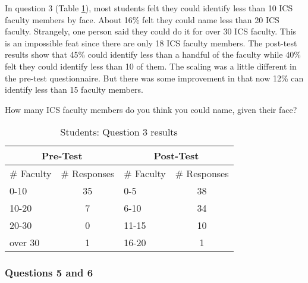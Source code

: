 In question 3 (Table \ref{tab:question3s}), most students felt they could
identify less than 10 ICS faculty members by face.  About 16\% felt they could
name less than 20 ICS faculty.  Strangely, one person said they could do it for
over 30 ICS faculty.  This is an impossible feat since there are only 18 ICS
faculty members.  The post-test results show that 45\% could identify less than
a handful of the faculty while 40\% felt they could identify less than 10 of
them.  The scaling was a little different in the pre-test questionnaire.  But
there was some improvement in that now 12\% can identify less than 15 faculty
members.

\begin{table}[htb]
\caption{Students: Question 3 results}
{How many ICS faculty members do you think you could name,
  given their face?}
\begin{center}
\begin{tabular}{|l|l|l|l|} \hline
 \multicolumn{2}{|c|}{\rule[-2mm]{0mm}{6mm}\bf Pre-Test} &
 \multicolumn{2}{|c|}{\rule[-2mm]{0mm}{6mm}\bf Post-Test} \\ \hline
 \# Faculty & \# Responses & \# Faculty & \# Responses \\ \hline
 0-10    & \multicolumn{1}{|c|}{35} & 0-5 &\multicolumn{1}{|c|}{38} \\ \hline 
 10-20   & \multicolumn{1}{|c|}{7} & 6-10 & \multicolumn{1}{|c|}{34} \\ \hline 
 20-30   & \multicolumn{1}{|c|}{0} & 11-15 & \multicolumn{1}{|c|}{10} \\ \hline 
 over 30 & \multicolumn{1}{|c|}{1} & 16-20 & \multicolumn{1}{|c|}{1} \\ \hline
\end{tabular}
\end{center}
\label{tab:question3s}
\end{table}

\subsubsection{Questions 5 and 6}

